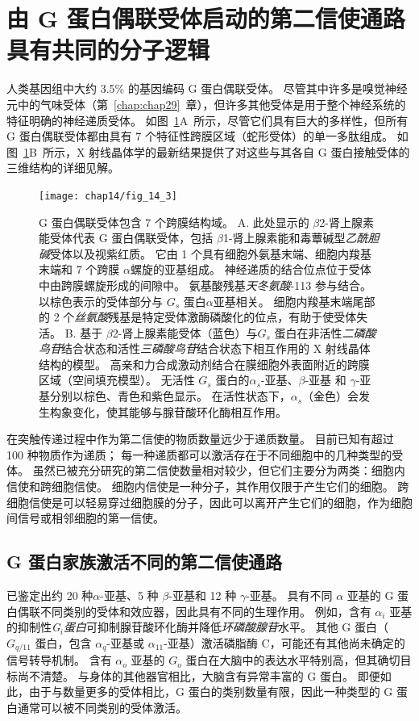 \section{由 G 蛋白偶联受体启动的第二信使通路具有共同的分子逻辑}

人类基因组中大约 3.5\% 的基因编码 G 蛋白偶联受体。
尽管其中许多是嗅觉神经元中的气味受体（第~\ref{chap:chap29}~章），但许多其他受体是用于整个神经系统的特征明确的神经递质受体。
如图~\ref{fig:14_3}A~所示，尽管它们具有巨大的多样性，但所有 G 蛋白偶联受体都由具有 7 个特征性跨膜区域（蛇形受体）的单一多肽组成。
如图~\ref{fig:14_3}B~所示，X 射线晶体学的最新结果提供了对这些与其各自 G 蛋白接触受体的三维结构的详细见解。


\begin{figure}[htbp]
	\centering
	\texttt{[image: chap14/fig\_14\_3]}
	\caption{G 蛋白偶联受体包含 7 个跨膜结构域。
		A. 此处显示的 $\beta$2-肾上腺素能受体代表 G 蛋白偶联受体，包括 $\beta$1-肾上腺素能和毒蕈碱型\textit{乙酰胆碱}受体以及视紫红质。
		它由 1 个具有细胞外氨基末端、细胞内羧基末端和 7 个跨膜 $\alpha$螺旋的亚基组成。
		神经递质的结合位点位于受体中由跨膜螺旋形成的间隙中。
		氨基酸残基\textit{天冬氨酸}-113 参与结合。
		以棕色表示的受体部分与 $ G_s $ 蛋白$\alpha$亚基相关。
		细胞内羧基末端尾部的 2 个\textit{丝氨酸}残基是特定受体激酶磷酸化的位点，有助于使受体失活\cite{frielle1989beta}。
		B. 基于 $\beta$2-肾上腺素能受体（蓝色）与$ G_s $ 蛋白在非活性\textit{二磷酸鸟苷}结合状态和活性\textit{三磷酸鸟苷}结合状态下相互作用的 X 射线晶体结构的模型。
		高亲和力合成激动剂结合在膜细胞外表面附近的跨膜区域（空间填充模型）。
		无活性 $ G_s $ 蛋白的$\alpha_s$-亚基、$\beta$-亚基 和 $\gamma$-亚基分别以棕色、青色和紫色显示。
		在活性状态下，$\alpha_s$（金色）会发生构象变化，使其能够与腺苷酸环化酶相互作用\cite{kobilka2013structural}。}
	\label{fig:14_3}
\end{figure}


在突触传递过程中作为第二信使的物质数量远少于递质数量。
目前已知有超过 100 种物质作为递质；
每一种递质都可以激活存在于不同细胞中的几种类型的受体。
虽然已被充分研究的第二信使数量相对较少，但它们主要分为两类：细胞内信使和跨细胞信使。
细胞内信使是一种分子，其作用仅限于产生它们的细胞。
跨细胞信使是可以轻易穿过细胞膜的分子，因此可以离开产生它们的细胞，作为细胞间信号或相邻细胞的第一信使。


\subsection{G 蛋白家族激活不同的第二信使通路}

已鉴定出约 20 种$\alpha$-亚基、5 种 $\beta$-亚基和 12 种 $\gamma$-亚基。
具有不同 $\alpha$ 亚基的 G 蛋白偶联不同类别的受体和效应器，因此具有不同的生理作用。
例如，含有 $\alpha _i$ 亚基的抑制性\textit{G$_i $蛋白}可抑制腺苷酸环化酶并降低\textit{环磷酸腺苷}水平。
其他 G 蛋白（$ G_{q/11} $ 蛋白，包含 $\alpha_q$-亚基或 $\alpha_{11}$-亚基）激活磷脂酶 C，可能还有其他尚未确定的信号转导机制。
含有 $\alpha_o$ 亚基的 $G_o$ 蛋白在大脑中的表达水平特别高，但其确切目标尚不清楚。
与身体的其他器官相比，大脑含有异常丰富的 G 蛋白。
即便如此，由于与数量更多的受体相比，G 蛋白的类别数量有限，因此一种类型的 G 蛋白通常可以被不同类别的受体激活。


